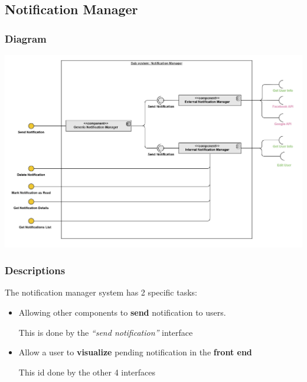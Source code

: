 \documentclass{article}
\begin{document}
\subsection{Notification Manager}
\subsubsection{Diagram}
\includegraphics[width=\textwidth,height=\textheight,keepaspectratio]{images/component_diagram/notification_manager.jpg}
\subsubsection{Descriptions}
The notification manager system has 2 specific tasks:
\begin{itemize}
    \item Allowing other components to \textbf{send} notification to users.

          This is done by the \textit{``send notification''} interface
    \item Allow a user to \textbf{visualize} pending notification in the \textbf{front end}

          This id done by the other 4 interfaces
\end{itemize}
\end{document}
